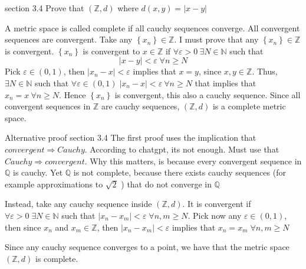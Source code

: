\documentclass[a4paper,norsk]{article}
\renewcommand{\geq}{\geqslant}
\renewcommand{\epsilon}{\varepsilon}
\begin{document}
\begin{oppgavebox}{section 3.4}{}
Prove that $ \left( \mathbb{Z}, d \right)  $ where $ d \left( x, y \right) = \left| x-y \right|  $ 

\begin{proofbox}{}{}
  A metric space is called complete if all cauchy sequences converge. All convergent sequences are convergent. Take any $ \left\{ x_n \right\} \in \mathbb{Z}  $. I must prove that any $ \left\{ x_n \right\} \in  \mathbb{Z} $  is convergent. $ \left\{ x_n \right\}  $ is convergent to $ x \in \mathbb{Z} $ if $ \forall \epsilon  > 0 \: \exists N \in \mathbb{N} $ such that 
  \[
      \left| x -y  \right| < \epsilon  \; \forall  n \geq N
  \]
  Pick $ \epsilon  \in  \left( 0, 1 \right)  $, then $ \left| x_n-x \right| < \epsilon  $ implies that $ x=y $, since $ x, y \in \mathbb{Z} $. Thus, $ \exists N \in \mathbb{N} $ such that $ \forall \epsilon \in \left( 0, 1 \right) \; \left| x_n - x \right| < \epsilon \: \forall n \geq N  $ that implies that $ x_n = x \: \forall n \geq N $. Hence $ \left\{ x_n \right\}  $ is convergent, this also a cauchy sequence. Since all convergent sequences in $ \mathbb{Z} $ are cauchy sequences, $ \left( \mathbb{Z}, d \right)  $ is a complete metric space.
\end{proofbox}

\begin{proofbox}{Alternative proof section 3.4}{}
  The first proof uses the implication that $ convergent \Rightarrow Cauchy $. According to chatgpt, its not enough. Must use that $ Cauchy \Rightarrow convergent $. Why this matters, is because every convergent sequence in $ \mathbb{Q} $   is cauchy. Yet $ \mathbb{Q} $ is not complete, because there exists cauchy sequences (for example approximations to $ \sqrt{ 2 } $ ) that do not converge in $ \mathbb{Q} $


  Instead, take any cauchy sequence inside $ \left( \mathbb{Z}, d \right)  $. It is convergent if $ \forall \epsilon > 0 \; \exists  N \in \mathbb{N} $ such that $ \left| x_n - x_m \right| < \epsilon  \; \forall n,m \geq N  $. Pick now any $ \epsilon \in \left( 0, 1 \right)  $, then since $ x_n $ and $ x_m \in  \mathbb{Z} $, then $ \left| x_n - x_m  \right| < \epsilon  $ implies that $ x_n = x_m \; \forall n,m \geq N$ 

  Since any cauchy sequence converges to a point, we have that the metric space $ \left( \mathbb{Z}, d \right)  $ is complete.
\end{proofbox}
\end{oppgavebox}
\end{document}
